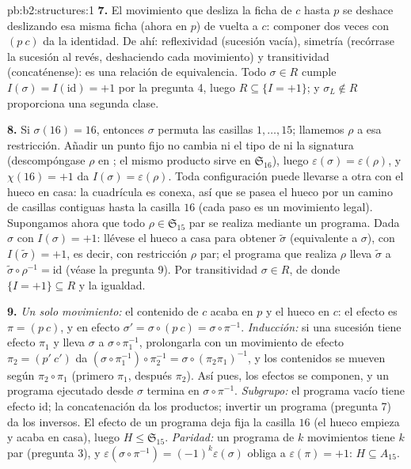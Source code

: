 \begin{solution}{pb:b2:structures:1}
\textbf{7.} El movimiento que desliza la ficha de $c$ hasta $p$ se
deshace deslizando esa misma ficha (ahora en $p$) de vuelta a $c$:
componer dos veces con $(p\ c)$ da la identidad. De ahí:
reflexividad (sucesión vacía), simetría (recórrase la sucesión al
revés, deshaciendo cada movimiento) y transitividad
(concaténense): es una relación de equivalencia. Todo $\sigma \in
R$ cumple $I(\sigma) = I(\mathrm{id}) = +1$ por la pregunta 4,
luego $R \subseteq \{I = +1\}$; y $\sigma_L \notin R$ proporciona
una segunda clase.

\textbf{8.} Si $\sigma(16) = 16$, entonces $\sigma$ permuta las
casillas $1, \dots, 15$; llamemos $\rho$ a esa restricción.
Añadir un punto fijo no cambia ni el tipo de  ni la
signatura (descompóngase $\rho$ en ; el mismo
producto sirve en $\mathfrak{S}_{16}$), luego $\varepsilon(\sigma)
= \varepsilon(\rho)$, y $\chi(16) = +1$ da $I(\sigma) =
\varepsilon(\rho)$. Toda configuración puede llevarse a otra con el
hueco en casa: la cuadrícula es conexa, así que se pasea el hueco
por un camino de casillas contiguas hasta la casilla $16$ (cada
paso es un movimiento legal). Supongamos ahora que todo $\rho \in
\mathfrak{S}_{15}$ par se realiza mediante un programa. Dada
$\sigma$ con $I(\sigma) = +1$: llévese el hueco a casa para obtener
$\widetilde\sigma$ (equivalente a $\sigma$), con
$I(\widetilde\sigma) = +1$, es decir, con restricción $\rho$ par;
el programa que realiza $\rho$ lleva $\widetilde\sigma$ a
$\widetilde\sigma \circ \rho^{-1} = \mathrm{id}$ (véase la pregunta
9). Por transitividad $\sigma \in R$, de donde $\{I = +1\}
\subseteq R$ y la igualdad.

\textbf{9.} \emph{Un solo movimiento:} el contenido de $c$ acaba en
$p$ y el hueco en $c$: el efecto es $\pi = (p\ c)$, y en efecto
$\sigma' = \sigma \circ (p\ c) = \sigma \circ \pi^{-1}$.
\emph{Inducción:} si una sucesión tiene efecto $\pi_1$ y lleva
$\sigma$ a $\sigma \circ \pi_1^{-1}$, prolongarla con un movimiento
de efecto $\pi_2 = (p'\ c')$ da $(\sigma \circ \pi_1^{-1}) \circ
\pi_2^{-1} = \sigma \circ (\pi_2\pi_1)^{-1}$, y los contenidos se
mueven según $\pi_2 \circ \pi_1$ (primero $\pi_1$, después
$\pi_2$). Así pues, los efectos se componen, y un programa
ejecutado desde $\sigma$ termina en $\sigma \circ \pi^{-1}$.
\emph{Subgrupo:} el programa vacío tiene efecto $\mathrm{id}$; la
concatenación da los productos; invertir un programa (pregunta 7)
da los inversos. El efecto de un programa deja fija la casilla $16$
(el hueco empieza y acaba en casa), luego $H \leq
\mathfrak{S}_{15}$. \emph{Paridad:} un programa de $k$ movimientos
tiene $k$ par (pregunta 3), y $\varepsilon(\sigma \circ \pi^{-1}) =
(-1)^k\varepsilon(\sigma)$ obliga a $\varepsilon(\pi) = +1$: $H
\subseteq A_{15}$.


\end{solution}
